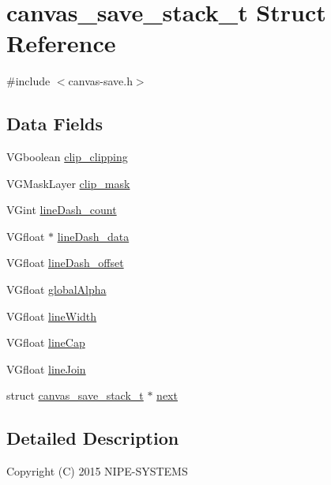 \hypertarget{structcanvas__save__stack__t}{}\section{canvas\+\_\+save\+\_\+stack\+\_\+t Struct Reference}
\label{structcanvas__save__stack__t}


{\ttfamily \#include $<$canvas-\/save.\+h$>$}

\subsection*{Data Fields}
\begin{DoxyCompactItemize}
\item 
V\+Gboolean \hyperlink{structcanvas__save__stack__t_a2c6afadff95edda2b6919484ece09bfd}{clip\+\_\+clipping}
\item 
V\+G\+Mask\+Layer \hyperlink{structcanvas__save__stack__t_abf0557dc1ac91549a277047c460f577c}{clip\+\_\+mask}
\item 
V\+Gint \hyperlink{structcanvas__save__stack__t_a2df714aaf02b6115f7bc0b5d72a8ddba}{line\+Dash\+\_\+count}
\item 
V\+Gfloat $\ast$ \hyperlink{structcanvas__save__stack__t_a3d7f3449563491d8f796bfd10d9f2720}{line\+Dash\+\_\+data}
\item 
V\+Gfloat \hyperlink{structcanvas__save__stack__t_a2a77bb2fd9162791d2913b8ebaaaf75b}{line\+Dash\+\_\+offset}
\item 
V\+Gfloat \hyperlink{structcanvas__save__stack__t_afe0bfcfcd94ff8e3961bc6fed3789352}{global\+Alpha}
\item 
V\+Gfloat \hyperlink{structcanvas__save__stack__t_ae76623d478ccfaec28e3166c755ec174}{line\+Width}
\item 
V\+Gfloat \hyperlink{structcanvas__save__stack__t_a222dc98f80e061f24d8a7c6a2bad337b}{line\+Cap}
\item 
V\+Gfloat \hyperlink{structcanvas__save__stack__t_a5d8ef969283a63b2d7f8d2e42da4196b}{line\+Join}
\item 
struct \hyperlink{structcanvas__save__stack__t}{canvas\+\_\+save\+\_\+stack\+\_\+t} $\ast$ \hyperlink{structcanvas__save__stack__t_a214b86daeaa6f4461d169921a9c0298d}{next}
\end{DoxyCompactItemize}


\subsection{Detailed Description}
Copyright (C) 2015 N\+I\+P\+E-\/\+S\+Y\+S\+T\+E\+M\+S

